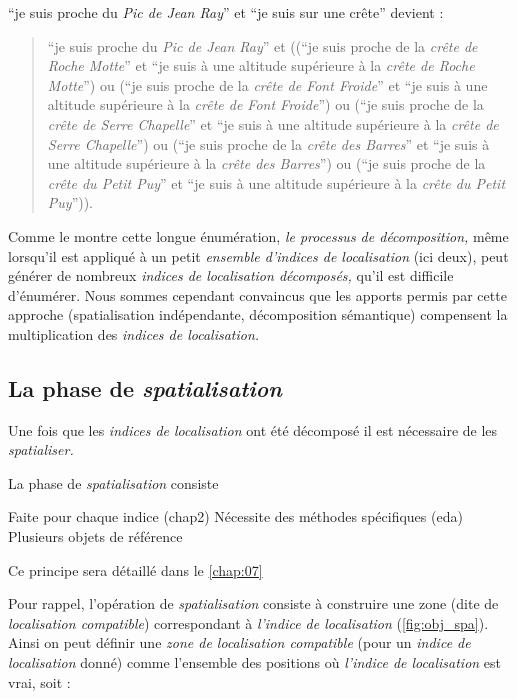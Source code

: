\enquote{je suis proche du \emph{Pic de Jean Ray}} et \enquote{je suis
  sur une crête} devient :
%
\begin{quote}
  \enquote{je suis proche du \emph{Pic de Jean Ray}} et ((\enquote{je
    suis proche de la \emph{crête de Roche Motte}} et \enquote{je suis
    à une altitude supérieure à la \emph{crête de Roche Motte}}) ou
  (\enquote{je suis proche de la \emph{crête de Font Froide}} et
  \enquote{je suis à une altitude supérieure à la \emph{crête de Font
      Froide}}) ou (\enquote{je suis proche de la \emph{crête de Serre
      Chapelle}} et \enquote{je suis à une altitude supérieure à la
    \emph{crête de Serre Chapelle}}) ou (\enquote{je suis proche de la
    \emph{crête des Barres}} et \enquote{je suis à une altitude
    supérieure à la \emph{crête des Barres}}) ou (\enquote{je suis
    proche de la \emph{crête du Petit Puy}} et \enquote{je suis à une
    altitude supérieure à la \emph{crête du Petit Puy}})).
\end{quote}
%
Comme le montre cette longue énumération, \emph{le processus de
  décomposition,} même lorsqu'il est appliqué à un petit
\emph{ensemble d'indices de localisation} (ici deux), peut générer de
nombreux \emph{indices de localisation décomposés,} qu'il est
difficile d'énumérer. Nous sommes cependant convaincus que les apports
permis par cette approche (\eg spatialisation indépendante,
décomposition sémantique) compensent la multiplication des
\emph{indices de localisation.}

\subsection{La phase de \emph{spatialisation}}

Une fois que les \emph{indices de localisation} ont été décomposé il
est nécessaire de les \emph{spatialiser.} 


La phase de \emph{spatialisation} consiste


Faite pour chaque indice (chap2)
Nécessite des méthodes spécifiques (eda)
Plusieurs objets de référence

Ce principe sera détaillé dans le \autoref{chap:07}

Pour rappel, l'opération de \emph{spatialisation} consiste à
construire une zone (dite de \emph{localisation compatible})
correspondant à \emph{l'indice de localisation}
(\autoref{fig:obj_spa}). Ainsi on peut définir une \emph{zone de
localisation compatible} (pour un \emph{indice de localisation} donné)
comme l'ensemble des positions où \emph{l'indice de localisation} est
vrai, soit :


